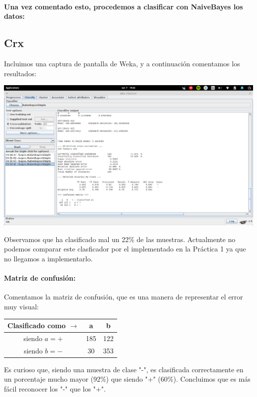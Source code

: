 \documentclass[nochap]{apuntes}
\begin{document}
\paragraph{Una vez comentado esto, procedemos a clasificar con NaiveBayes los datos:}
\subsection{Crx}

Incluimos una captura de pantalla de Weka, y a continuación comentamos los resultados:

\begin{center}
\includegraphics[scale=0.3]{img/crx_NBSimple.png}
\end{center}


Observamos que ha clasificado mal un 22\% de las muestras. Actualmente no podemos comparar este clasficador por el implementado en la Práctica 1 ya que no llegamos a implementarlo. 

\paragraph{Matriz de confusión:} Comentamos la matriz de confusión, que es una manera de representar el error muy visual:

\begin{center}
\begin{tabular}{c|cc}
Clasificado como $\to$ & a & b \\\hline
siendo $a = +$ & 185 & 122 \\
siendo $b = -$ & 30 & 353
\end{tabular}
\end{center}


Es curioso que, siendo una muestra de clase "-", es clasificada correctamente en un porcentaje mucho mayor (92\%) que siendo "+" (60\%). Concluimos que es más fácil reconocer los "-" que los "+".
\end{document}
